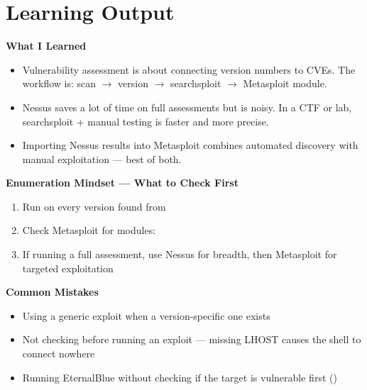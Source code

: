 \section{Learning Output}

\begin{takebox}
\textbf{What I Learned}
\begin{itemize}
  \item Vulnerability assessment is about connecting version numbers to CVEs.
        The workflow is: scan $\rightarrow$ version $\rightarrow$ searchsploit
        $\rightarrow$ Metasploit module.
  \item Nessus saves a lot of time on full assessments but is noisy. In a CTF
        or lab, searchsploit + manual testing is faster and more precise.
  \item Importing Nessus results into Metasploit combines automated discovery with
        manual exploitation --- best of both.
\end{itemize}

\textbf{Enumeration Mindset --- What to Check First}
\begin{enumerate}
  \item Run  on every version found from 
  \item Check Metasploit for modules: 
  \item If running a full assessment, use Nessus for breadth, then Metasploit
        for targeted exploitation
\end{enumerate}

\textbf{Common Mistakes}
\begin{itemize}
  \item Using a generic exploit when a version-specific one exists
  \item Not checking  before running an exploit --- missing
        LHOST causes the shell to connect nowhere
  \item Running EternalBlue without checking if the target is vulnerable first
        ()
\end{itemize}
\end{takebox}
